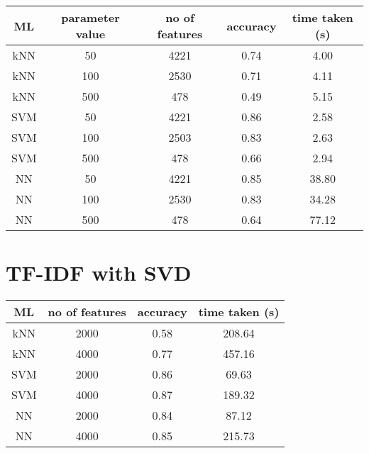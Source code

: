 \begin{center}
	\begin{tabular}{|| c | c | c | c | c||}
		\hline
		ML & parameter value & no of features & accuracy & time taken (s) \\ [0.5ex]
		\hline\hline
		kNN & 50 & 4221 & 0.74 & 4.00 \\ 
		\hline
		kNN & 100 & 2530 & 0.71 & 4.11 \\ 
		\hline
		kNN & 500 & 478 & 0.49 & 5.15 \\ 
		\hline\hline
		SVM & 50 & 4221 & 0.86 & 2.58 \\
		\hline
		SVM & 100 & 2503 & 0.83 & 2.63 \\
		\hline
		SVM & 500 & 478 & 0.66 & 2.94 \\
		\hline\hline
		NN & 50 & 4221 & 0.85 & 38.80 \\
		\hline
		NN & 100 & 2530 & 0.83 & 34.28 \\
		\hline
		NN & 500 & 478 & 0.64 & 77.12 \\
		\hline\hline
	\end{tabular}
\end{center}

\section{TF-IDF with SVD}

\begin{center}
	\begin{tabular}{|| c | c | c | c||}
		\hline
		ML & no of features & accuracy & time taken (s) \\ [0.5ex]
		\hline\hline
		kNN & 2000 & 0.58 & 208.64 \\ 
		\hline
		kNN & 4000 & 0.77 & 457.16 \\
		\hline\hline
		SVM & 2000 & 0.86 & 69.63 \\
		\hline
		SVM & 4000 & 0.87 & 189.32 \\
		\hline\hline
		NN & 2000 & 0.84 & 87.12 \\
		\hline
		NN & 4000 & 0.85 & 215.73 \\
		\hline\hline
	\end{tabular}
\end{center}